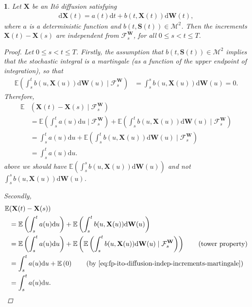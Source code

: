 \documentclass[english]{article}
\newcommand{\comment}[1]{\color{blue}#1\color{black}}
\numberwithin{equation}{section}
\numberwithin{figure}{section}
\theoremstyle{bolddescit}
\theoremstyle{definition}
\theoremstyle{definition}
\theoremstyle{plain}
\newtheorem{lemma}[theorem]{\protect\lemmaname}
\theoremstyle{plain}
\theoremstyle{bolddesc}
\theoremstyle{plain}
\theoremstyle{remark}
\providecommand{\lemmaname}{Lemma}
\begin{document}
\begin{lemma}\label{lem:fp-ito-diffusion-indep-increments}
  Let $\mathbf{X}$ be an It\^o diffusion satisfying
  \begin{align}\label{eq:fp-ito-diffusion-deterministic-drift}
    \mathrm{d}\mathbf{X}(t) = a(t) \mathrm{d}t + b(t,\mathbf{X}(t)) \mathrm{d}\mathbf{W}(t),
  \end{align}
  where $a$ is a deterministic function and $b(t,\mathbf{S}(t)) \in \mathcal{M}^2$. Then the increments $\mathbf{X}(t) - \mathbf{X}(s)$ are independent from $\mathcal{F}^\mathbf{W}_s$, for all $0 \le s < t \le T$.

  \begin{proof}
    Let $0 \le s < t \le T$. Firstly, the assumption that $b(t,\mathbf{S}(t)) \in \mathcal{M}^2$ implies that the stochastic integral is a martingale (as a function of the upper endpoint of integration), so that
    \begin{align}\label{eq:fp-ito-diffusion-indep-increments-martingale}
      \mathbb{E}\left(\int_s^t b(u,\mathbf{X}(u)) \mathrm{d}\mathbf{W}(u) \mid \mathcal{F}^\mathbf{W}_s\right)
      &= \int_s^s b(u,\mathbf{X}(u)) \mathrm{d}\mathbf{W}(u) = 0.
    \end{align}
    Therefore,
    \begin{align*}
      \mathbb{E}&(\mathbf{X}(t) - \mathbf{X}(s) \mid \mathcal{F}^\mathbf{W}_s)\\
      &= \mathbb{E}\left(\int_s^t a(u) \mathrm{d}u \mid \mathcal{F}^\mathbf{W}_s\right) + \mathbb{E}\left(\int_s^t b(u,\mathbf{X}(u)) \mathrm{d}\mathbf{W}(u) \mid \mathcal{F}^\mathbf{W}_s\right)\\
      &= \int_s^t a(u) \mathrm{d}u + \mathbb{E}\left(\int_s^t b(u,\mathbf{X}(u)) \mathrm{d}\mathbf{W}(u) \mid \mathcal{F}^\mathbf{W}_s\right) \tag{$a$ deterministic}\\
      &= \int_s^t a(u) \mathrm{d}u.
    \end{align*}
\comment{above we should have $\mathbb{E}\left(\int_s^s b(u,\mathbf{X}(u)) \mathrm{d}\mathbf{W}(u)\right)$ and not $\int_s^s b(u,\mathbf{X}(u)) \mathrm{d}\mathbf{W}(u)$.}

    Secondly,
    \begin{align*}
      \mathbb{E}&(\mathbf{X}(t) - \mathbf{X}(s))\\
      &= \mathbb{E}\left(\int_s^t a(u) \mathrm{d}u\right) + \mathbb{E}\left(\int_s^t b(u,\mathbf{X}(u)) \mathrm{d}\mathbf{W}(u)\right)\\
      &= \mathbb{E}\left(\int_s^t a(u) \mathrm{d}u\right) + \mathbb{E}\left(\mathbb{E}\left(\int_s^t b(u,\mathbf{X}(u)) \mathrm{d}\mathbf{W}(u) \mid \mathcal{F}^\mathbf{W}_s\right)\right) \tag{tower property}\\
      &= \int_s^t a(u) \mathrm{d}u + \mathbb{E}\left(0\right) \tag{by \eqref{eq:fp-ito-diffusion-indep-increments-martingale}}\\
      &= \int_s^t a(u) \mathrm{d}u.
    \end{align*}


\end{proof}
\end{lemma}
\end{document}
